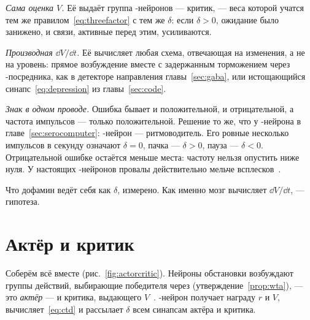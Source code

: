\emph{Сама оценка $V$.} Её выдаёт группа -нейронов --- критик, --- веса которой учатся тем же правилом~\eqref{eq:threefactor} с тем же $\delta$: если $\delta>0$, ожидание было занижено, и связи, активные перед этим, усиливаются.

\emph{Производная $\dd V/\dd t$.} Её вычисляет любая схема, отвечающая на изменения, а не на уровень: прямое возбуждение вместе с задержанным торможением через -посредника, как в детекторе направления главы~\ref{sec:gaba}, или истощающийся синапс~\eqref{eq:depression} из главы~\ref{sec:code}.

\emph{Знак в одном проводе.} Ошибка бывает и положительной, и отрицательной, а частота импульсов --- только положительной. Решение то же, что у -нейрона в главе~\ref{sec:serocomputer}: -нейрон --- ритмоводитель. Его ровные несколько импульсов в секунду означают $\delta=0$, пачка --- $\delta>0$, пауза --- $\delta<0$. Отрицательной ошибке остаётся меньше места: частоту нельзя опустить ниже нуля. У настоящих -нейронов провалы действительно мельче всплесков~\cite{Bayer2005}.

Что дофамин ведёт себя как $\delta$, измерено. Как именно мозг вычисляет $\dd V/\dd t$, --- гипотеза.

\section{Актёр и критик}

Соберём всё вместе (рис.~\ref{fig:actorcritic}). Нейроны обстановки возбуждают группы действий, выбирающие победителя через  (утверждение~\ref{prop:wta}), --- это \emph{актёр} --- и критика, выдающего $V$~\cite{SuttonBarto2018}. -нейрон получает награду $r$ и $V$, вычисляет~\eqref{eq:ctd} и рассылает $\delta$ всем синапсам актёра и критика.

